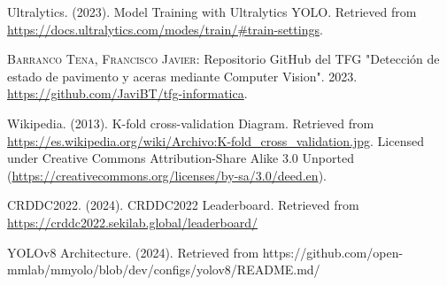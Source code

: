 \begin{thebibliography}{10}
        Ultralytics. (2023). Model Training with Ultralytics YOLO. Retrieved from \url{https://docs.ultralytics.com/modes/train/#train-settings}.

        \textsc{Barranco Tena, Francisco Javier}:
        Repositorio GitHub del TFG "Detección de estado de pavimento y aceras mediante Computer Vision".
        2023.
        \url{https://github.com/JaviBT/tfg-informatica}.

        Wikipedia. (2013). K-fold cross-validation Diagram.
        Retrieved from  \url{https://es.wikipedia.org/wiki/Archivo:K-fold_cross_validation.jpg}.
        Licensed under Creative Commons Attribution-Share Alike 3.0 Unported (\url{https://creativecommons.org/licenses/by-sa/3.0/deed.en}).
    
        CRDDC2022. (2024). CRDDC2022 Leaderboard. Retrieved from \url{https://crddc2022.sekilab.global/leaderboard/}

        YOLOv8 Architecture. (2024). Retrieved from https://github.com/open-mmlab/mmyolo/blob/dev/configs/yolov8/README.md/

  \end{thebibliography}
  